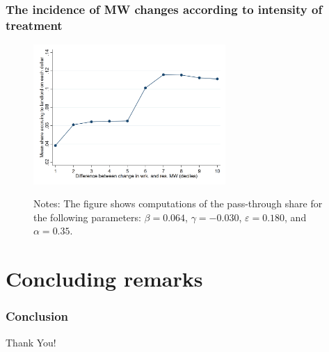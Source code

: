 \documentclass[aspectratio=169, t]{beamer}
\begin{document}
\begin{frame}
	\frametitle{The incidence of MW changes according to intensity of treatment}
	
	\begin{figure}
		\includegraphics[width = 0.65\textwidth]{counterfactuals/output/deciles_diff.png}
		\begin{minipage}{.95\textwidth} \footnotesize
			\vspace{2mm}
			Notes: The figure shows computations of the pass-through share for the following
			parameters: $\beta = 0.064$, $\gamma = -0.030$, $\varepsilon = 0.180$, and $\alpha=0.35$.
		\end{minipage}
	\end{figure}
\end{frame}

\section{Concluding remarks}

\begin{frame}
	\frametitle{Conclusion}
	
	
\end{frame}

\begin{frame}[c]
    \begin{center}
    	\Large Thank You!
    \end{center}
\end{frame}


\appendix

\renewcommand\thetable{\thesection.\arabic{table}} 
\renewcommand\thefigure{\thesection.\arabic{figure}} 
\setcounter{table}{0}
\setcounter{figure}{0}
\end{document}

